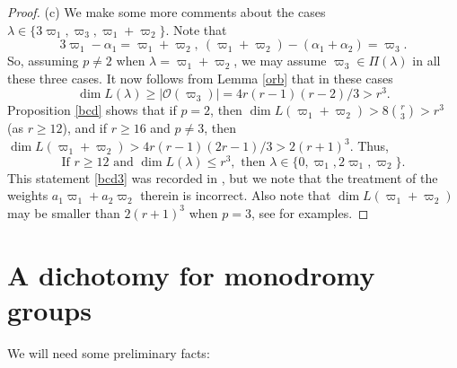 \documentclass[11pt]{amsart}
\theoremstyle{plain}
\theoremstyle{definition}
\numberwithin{thm}{section}
\numberwithin{equation}{thm}
\newcommand{\al}{\alpha}
\newcommand{\om}{\varpi}
\newcommand{\sO}{{\mathcal O}}
\newcommand{\0}{\emptyset}
\newcommand{\lam}{\lambda}
\begin{document}
\begin{proof}
\smallskip
(c) We make some more comments about the cases $\lam \in \{3\om_1,\om_3,\om_1+\om_2\}$. Note 
that 
$$3\om_1-\al_1 = \om_1+\om_2,~(\om_1+\om_2)-(\al_1+\al_2)=\om_3.$$ 
So, assuming $p \neq 2$ when $\lam=\om_1+\om_2$, we may assume $\om_3 \in \Pi(\lam)$ in all these three cases. It now follows from Lemma \ref{orb} that in these cases
$$\dim L(\lam) \geq |\sO(\om_3)| = 4r(r-1)(r-2)/3 > r^3.$$ 
Proposition \ref{bcd} shows that if $p=2$, then $\dim L(\om_1+\om_2) > 8\binom{r}{3} > r^3$ (as $r \geq 12$), and 
if $r \geq 16$ and $p \neq 3$, then $\dim L(\om_1+\om_2) > 4r(r-1)(2r-1)/3 > 2(r+1)^3$.
Thus, 
\begin{equation}\label{bcd3}
  \mbox{If }r \geq 12\mbox{ and }\dim L(\lam) \leq r^3, \mbox{ then }\lam \in \{0,\om_1,2\om_1,\om_2\}.
\end{equation}
This statement \eqref{bcd3} was 
recorded in \cite[Theorem 5.1]{Lu}, but we note that the treatment of the weights $a_1\om_1+a_2\om_2$ therein is 
incorrect. Also note that $\dim L(\om_1+\om_2)$ may be smaller than $2(r+1)^3$ when $p=3$, see \cite{Lu} for examples.
\end{proof}



\section{A dichotomy for monodromy groups}

We will need some preliminary facts:
\end{document}
